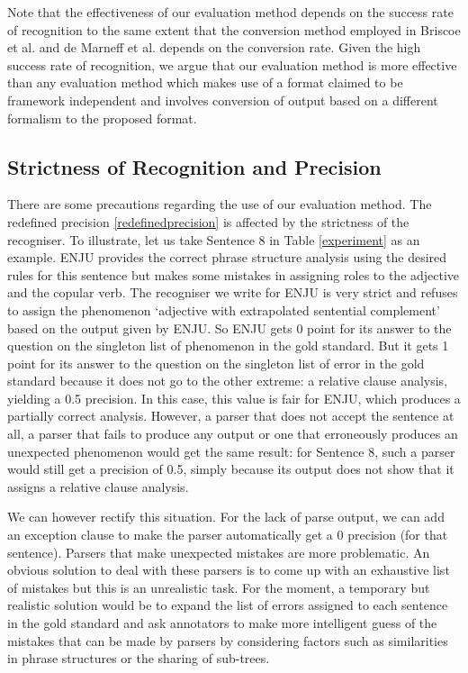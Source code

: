\documentclass[11pt]{article}
\begin{document}
Note that the effectiveness of our evaluation method depends on the success rate of recognition to the same extent that the conversion method employed in Briscoe et al.  and de Marneff et al.  depends on the conversion rate. Given the high success rate of recognition, we argue that our evaluation method is more effective than any evaluation method which makes use of a format claimed to be framework independent and involves conversion of output based on a different formalism to the proposed format. 

\subsection{Strictness of Recognition and Precision}

There are some precautions regarding the use of our evaluation method. The redefined precision \ref{redefinedprecision} is affected by the strictness of the recogniser. To illustrate, let us take Sentence 8 in Table \ref{experiment} as an example. ENJU provides the correct phrase structure analysis using the desired rules for this sentence but makes some mistakes in assigning roles to the adjective and the copular verb. The recogniser we write for ENJU is very strict and refuses to assign the phenomenon `adjective with extrapolated sentential complement' based on the output given by ENJU. So ENJU gets 0 point for its answer to the question on the singleton list of phenomenon in the gold standard. But it gets 1 point for its answer to  the question on the singleton list of error in the gold standard because it does not go to the other extreme: a relative clause analysis, yielding a 0.5 precision. In this case, this value is fair for ENJU, which produces a partially correct analysis. However, a parser that does not accept the sentence at all, a parser that fails to produce any output or one that erroneously produces an unexpected phenomenon would get the same result: for Sentence 8, such a parser would still get a precision of 0.5, simply because its output does not show that it assigns a relative clause analysis. 

We can however rectify this situation. For the lack of parse output, we can add an exception clause to make the parser automatically get a 0 precision (for that sentence). Parsers that make unexpected mistakes are more problematic. An obvious solution to deal with these parsers is to come up with an exhaustive list of mistakes but this is an unrealistic task. For the moment, a temporary but realistic solution would be to expand the list of errors assigned to each sentence in the gold standard and ask annotators to make more intelligent guess of the mistakes that can be made by parsers by considering factors such as similarities in phrase structures or the sharing of sub-trees. 
\end{document}
